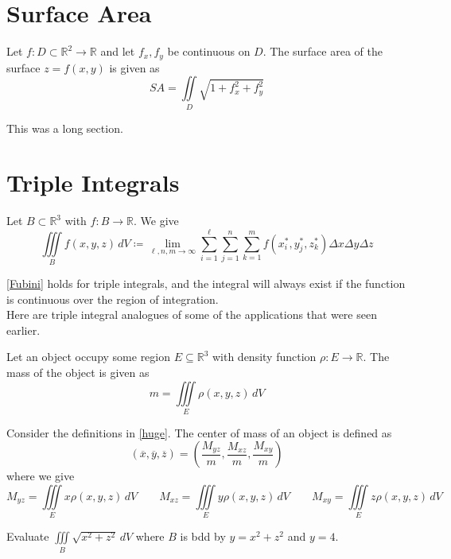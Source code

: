 \section{Surface Area}
\begin{definition}
    Let \(f:D\subset \mathbb{R}^2\to \mathbb{R}\) and let \(f_x,f_y\) be continuous on \(D\). The surface area of the surface \(z=f(x,y)\) is given as
    \[
        SA=\iint\limits_{D}\sqrt{1+f_x ^2 +f_y ^2} 
    \]
\end{definition}
    This was a long section.
\section{Triple Integrals}
\begin{definition}
    Let \(B \subset \mathbb{R}^3\) with \(f:B\to \mathbb{R}\). We give 
    \[
        \iiint\limits_{B}f(x,y,z)\,dV \coloneqq \lim_{\ell,n,m \to \infty}\sum_{i=1}^\ell \sum_{j=1}^n \sum_{k=1}^m f \left( x_i^*,y_j^*,z_k^* \right) \Delta x \Delta y \Delta z
    \]
\end{definition}
\ref{Fubini} holds for triple integrals, and the integral will always exist if the function is continuous over the region of integration.\\
Here are triple integral analogues of some of the applications that were seen earlier.
\begin{definition}\label{huge}
    Let an object occupy some region \(E \subseteq \mathbb{R}^3\) with density function \(\rho :E\to \mathbb{R}\). The mass of the object is given as 
    \[
        m=\iiint\limits_{E} \rho (x,y,z)\,dV
    \]
\end{definition}
\begin{definition}
    Consider the definitions in \ref{huge}. The center of mass of an object is defined as 
    \[
        \left( \overline{x} ,\overline{y} ,\overline{z}  \right) = \left( \frac{M_{yz} }{m},\frac{M_{xz} }{m},\frac{M_{xy} }{m} \right)
    \]
    where we give
    \[
        M_{yz}=\iiint\limits_{E}x \rho (x,y,z)\,dV \qquad M_{xz}=\iiint\limits_{E}y \rho (x,y,z)\,dV \qquad M_{xy}=\iiint\limits_{E}z \rho (x,y,z)\,dV
    \]
\end{definition}
\begin{exercise}
    Evaluate \(\iiint\limits_{B}\sqrt{x^2 +z^2}\,dV \) where \(B\) is bdd by \(y=x^2 +z^2\) and \(y=4\).
\end{exercise}
